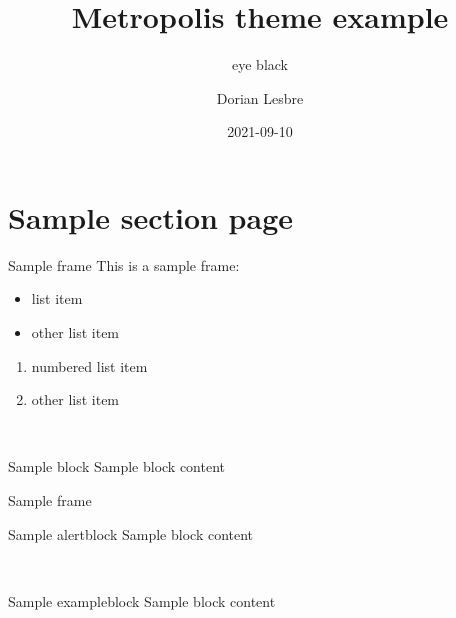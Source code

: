\documentclass[14pt]{beamer}
\title{Metropolis theme example}
\subtitle{eye black}
\author{Dorian Lesbre}
\date{2021-09-10}
\begin{document}
\begin{frame}
	\titlepage
\end{frame}

\section{Sample section page}

\begin{frame}{Sample frame}
	This is a sample frame:
	\begin{multicols}{2}
		\begin{itemize}
			\item list item
			\item other list item
		\end{itemize}
		\begin{enumerate}
			\item numbered list item
			\item other list item
		\end{enumerate}
	\end{multicols}
	~\\
	\begin{block}{Sample block}
		Sample block content
	\end{block}
\end{frame}

\begin{frame}{Sample frame}

	\begin{alertblock}{Sample alertblock}
		Sample block content
	\end{alertblock}
	~\\
	\begin{exampleblock}{Sample exampleblock}
		Sample block content
	\end{exampleblock}
\end{frame}
\end{document}
